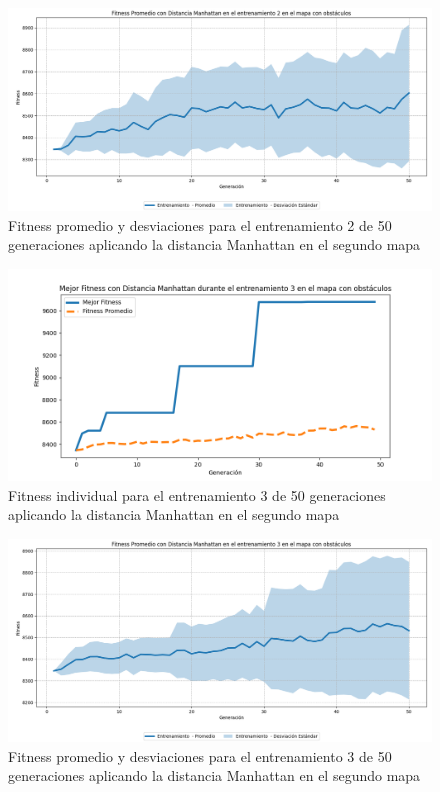 \documentclass[lettersize, journal]{IEEEtran}
\begin{document}
\begin{figure}[H]
    \centering
    \includegraphics[width=0.9 \linewidth]{Manhattan/Mapa2/Fitness_2_Map2_Manh_50Gen_Sombra.png}
    \caption{Fitness promedio y desviaciones para el entrenamiento 2 de 50 generaciones aplicando la distancia Manhattan en el segundo mapa}
    \label{fig:manh_2_50_sombra_m2}
\end{figure}

\begin{figure}[H]
    \centering
    \includegraphics[width=0.9 \linewidth]{Manhattan/Mapa2/Fitness_3_Map2_Manh_50Gen.png}
    \caption{Fitness individual para el entrenamiento 3 de 50 generaciones aplicando la distancia Manhattan en el segundo mapa}
    \label{fig:manh_3_50_m2}
\end{figure}
\begin{figure}[H]
    \centering
    \includegraphics[width=0.9 \linewidth]{Manhattan/Mapa2/Fitness_3_Map2_Manh_50Gen_Sombra.png}
    \caption{Fitness promedio y desviaciones para el entrenamiento 3 de 50 generaciones aplicando la distancia Manhattan en el segundo mapa}
    \label{fig:manh_3_50_sombra_m2}
\end{figure}
\end{document}
